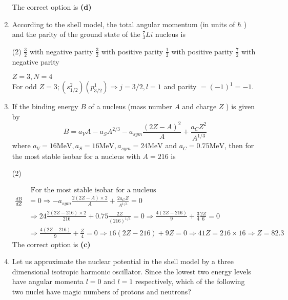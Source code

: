 \begin{enumerate}
\begin{tasks}
\end{tasks}
\begin{answer}
	The correct option is \textbf{(d)}
\end{answer}
\item According to the shell model, the total angular momentum (in units of $\hbar$ ) and the parity of the ground state of the ${ }_{3}^{7} L i$ nucleus is
{}
\begin{tasks}(2)
	\task[\textbf{A.}] $\frac{3}{2}$ with negative parity
	\task[\textbf{B.}] $\frac{3}{2}$ with positive parity
	\task[\textbf{C.}]$\frac{1}{2}$ with positive parity
	\task[\textbf{D.}]$\frac{7}{2}$ with negative parity
\end{tasks}
\begin{answer}
 $Z=3, N=4$\\
	For odd $Z=3 ;\left(s_{1 / 2}^{2}\right)\left(p_{3 / 2}^{1}\right) \Rightarrow j=3 / 2, l=1$ and parity $=(-1)^{1}=-1$.
\end{answer}
\item If the binding energy $B$ of a nucleus (mass number $A$ and charge $Z$ ) is given by
$$
B=a_{V} A-a_{S} A^{2 / 3}-a_{s y m} \frac{(2 Z-A)^{2}}{A}+\frac{a_{C} Z^{2}}{A^{1 / 3}}
$$
where $a_{V}=16 \mathrm{MeV}, a_{S}=16 \mathrm{MeV}, a_{s y m}=24 \mathrm{MeV}$ and $a_{C}=0.75 \mathrm{MeV}$, then for the most stable isobar for a nucleus with $A=216$ is
{}
\begin{tasks}(2)
\end{tasks}
\begin{answer}
	\begin{align*}
	&\text { For the most stable isobar for a nucleus }\\
	\frac{d B}{d Z}&=0 \Rightarrow-a_{s y m} \frac{2(2 Z-A) \times 2}{A}+\frac{2 a_{C} Z}{A^{1 / 3}}=0\\
	&\Rightarrow 24 \frac{2(2 Z-216) \times 2}{216}+0.75 \frac{2 Z}{(216)^{1 / 3}}=0 \Rightarrow \frac{4(2 Z-216)}{9}+\frac{3}{4} \frac{2 Z}{6}=0\\
	&\Rightarrow \frac{4(2 Z-216)}{9}+\frac{Z}{4}=0 \Rightarrow 16(2 Z-216)+9 Z=0 \Rightarrow 41 Z=216 \times 16 \Rightarrow Z=82.3
	\end{align*}
	The correct option is \textbf{(c)}
\end{answer}
\item Let us approximate the nuclear potential in the shell model by a three dimensional isotropic harmonic oscillator. Since the lowest two energy levels have angular momenta $l=0$ and $l=1$ respectively, which of the following two nuclei have magic numbers of protons and neutrons?

\end{enumerate}
